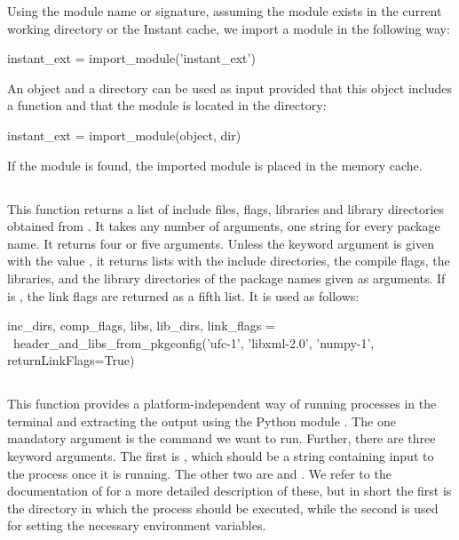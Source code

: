 Using the module name or signature, assuming the
module  exists in the current working directory or
the Instant cache, we import a module in the following way:
\begin{python}
instant_ext = import_module('instant_ext')
\end{python}
An object and a directory can be used as input provided that this object includes a
function  and that the module is located in the
directory:
\begin{python}
instant_ext = import_module(object, dir)
\end{python}
If the module is found, the imported module is placed in the memory cache.

\subsection[header\_and\_libs\_from\_pkgconfig]{}

This function returns a list of include files, flags, libraries and library
directories obtained from
. It takes any
number of arguments, one string for every package name.  It returns
four or five arguments. Unless the keyword
argument  is given with the value , it
returns lists with the include directories, the compile flags, the
libraries, and the library directories of the package names given as
arguments. If  is , the link flags are
returned as a fifth list.  It is used as follows:
\begin{python}
inc_dirs, comp_flags, libs, lib_dirs, link_flags = \
header_and_libs_from_pkgconfig('ufc-1', 'libxml-2.0',
                               'numpy-1',
                               returnLinkFlags=True)
\end{python}

\subsection[get\_status\_output]{}

This function provides a platform-independent way of running processes
in the terminal and extracting the output using the Python
module . The one mandatory argument is the command we
want to run. Further, there are three keyword arguments. The first
is \emp{input}, which should be a string containing input to the
process once it is running. The other two are \emp{cwd}
and . We refer to the documentation of  for a
more detailed description of these, but in short the first is the
directory in which the process should be executed, while the second is
used for setting the necessary environment variables.

